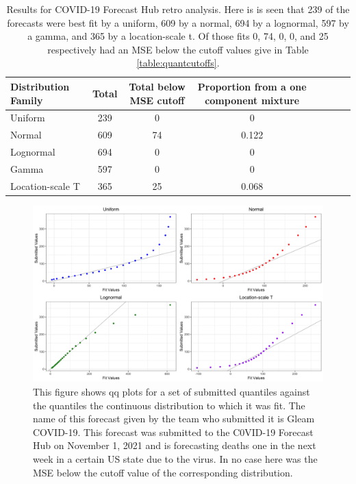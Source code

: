 \documentclass[11pt,notitlepage]{isuthesis}
\begin{document}
\begin{table}[h!]
  \centering
  \begin{tabular}{l*{6}{c}r}
  Distribution Family   & Total    & Total below MSE cutoff 
  & Proportion from a one component mixture\\
  \hline
  Uniform               & 239      & 0    & 0    \\
  Normal                & 609      & 74   & 0.122    \\
  Lognormal             & 694      & 0    & 0    \\
  Gamma                 & 597      & 0    & 0    \\
  Location-scale T      & 365      & 25   & 0.068    \\
  \end{tabular}
  \begin{center}
\begin{minipage}{10cm}
\captionsetup{font=scriptsize}
  \caption[COVID-19 Forecast Hub results]{Results for COVID-19 Forecast Hub
  retro analysis. Here is is seen that 239 of the forecasts were best fit by 
  a uniform, 609 by a normal, 694 by a lognormal, 597 by a gamma, and 365 by
  a location-scale t. Of those fits 0, 74, 0, 0, and 25 respectively had an 
  MSE below the cutoff values give in Table \ref{table:quantcutoffs}.}
  \label{table:cresults}
  \end{minipage}
  \end{center}
\end{table}


\begin{figure}[htbp]
\centerline{\includegraphics[scale=.15]{Images/qq_gleam_110121_1wkincdeath_st16.png}}
\begin{center}
\begin{minipage}{10cm}
\captionsetup{font=scriptsize}
\caption[QQ plot for quantile fit]{This figure shows qq plots for a set of
submitted quantiles against the quantiles the continuous distribution to which
it was fit. 
The name of this forecast given by the team who submitted it is Gleam COVID-19.
This forecast was submitted to the C0VID-19 Forecast Hub on November 1, 2021
and is forecasting deaths one in the next week in a certain US state due to the
virus.
In no case here was the MSE below the cutoff value of the 
corresponding distribution.}
\label{fig:qqfits}
\end{minipage}
\end{center}
\end{figure}
\end{document}
